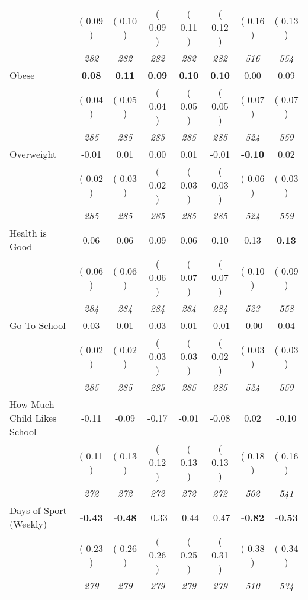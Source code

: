 \begin{tabular}{l c c c c c c c}
& (     0.09 ) & (     0.10 ) & (     0.09 ) & (     0.11 ) & (     0.12 ) & (     0.16 ) & (     0.13 ) \\
& \textit{ 282 } & \textit{ 282 } & \textit{ 282 } & \textit{ 282 } & \textit{ 282 } & \textit{ 516 } & \textit{ 554 } \\
Obese & \textbf{      0.08 } & \textbf{      0.11 } & \textbf{      0.09 } & \textbf{     0.10} & \textbf{     0.10} &      0.00 &      0.09 \\
& (     0.04 ) & (     0.05 ) & (     0.04 ) & (     0.05 ) & (     0.05 ) & (     0.07 ) & (     0.07 ) \\
& \textit{ 285 } & \textit{ 285 } & \textit{ 285 } & \textit{ 285 } & \textit{ 285 } & \textit{ 524 } & \textit{ 559 } \\
Overweight &     -0.01 &      0.01 &      0.00 &      0.01 &     -0.01 & \textbf{     -0.10 } &      0.02 \\
& (     0.02 ) & (     0.03 ) & (     0.02 ) & (     0.03 ) & (     0.03 ) & (     0.06 ) & (     0.03 ) \\
& \textit{ 285 } & \textit{ 285 } & \textit{ 285 } & \textit{ 285 } & \textit{ 285 } & \textit{ 524 } & \textit{ 559 } \\
Health is Good &      0.06 &      0.06 &      0.09 &      0.06 &      0.10 &      0.13 & \textbf{      0.13 } \\
& (     0.06 ) & (     0.06 ) & (     0.06 ) & (     0.07 ) & (     0.07 ) & (     0.10 ) & (     0.09 ) \\
& \textit{ 284 } & \textit{ 284 } & \textit{ 284 } & \textit{ 284 } & \textit{ 284 } & \textit{ 523 } & \textit{ 558 } \\
Go To School &      0.03 &      0.01 &      0.03 &      0.01 &     -0.01 &     -0.00 &      0.04 \\
& (     0.02 ) & (     0.02 ) & (     0.03 ) & (     0.03 ) & (     0.02 ) & (     0.03 ) & (     0.03 ) \\
& \textit{ 285 } & \textit{ 285 } & \textit{ 285 } & \textit{ 285 } & \textit{ 285 } & \textit{ 524 } & \textit{ 559 } \\
How Much Child Likes School &     -0.11 &     -0.09 &     -0.17 &     -0.01 &     -0.08 &      0.02 &     -0.10 \\
& (     0.11 ) & (     0.13 ) & (     0.12 ) & (     0.13 ) & (     0.13 ) & (     0.18 ) & (     0.16 ) \\
& \textit{ 272 } & \textit{ 272 } & \textit{ 272 } & \textit{ 272 } & \textit{ 272 } & \textit{ 502 } & \textit{ 541 } \\
Days of Sport (Weekly) & \textbf{     -0.43 } & \textbf{     -0.48 } &     -0.33 &     -0.44 &     -0.47 & \textbf{     -0.82 } & \textbf{     -0.53 } \\
& (     0.23 ) & (     0.26 ) & (     0.26 ) & (     0.25 ) & (     0.31 ) & (     0.38 ) & (     0.34 ) \\
& \textit{ 279 } & \textit{ 279 } & \textit{ 279 } & \textit{ 279 } & \textit{ 279 } & \textit{ 510 } & \textit{ 534 } \\
\bottomrule
\end{tabular}
